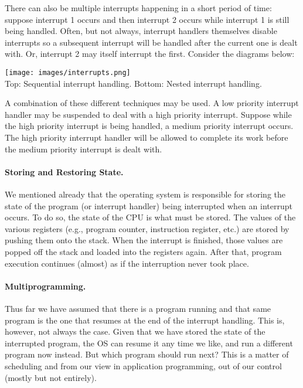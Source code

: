 There can also be multiple interrupts happening in a short period of time: suppose interrupt 1 occurs and then interrupt 2 occurs while interrupt 1 is still being handled. Often, but not always, interrupt handlers themselves disable interrupts so a subsequent interrupt will be handled after the current one is dealt with. Or, interrupt 2 may itself interrupt the first. Consider the diagrams below:

\begin{center}
	\texttt{[image: images/interrupts.png]}\\
	Top: Sequential interrupt handling. Bottom: Nested interrupt handling.~\cite{osi}
\end{center}

A combination of these different techniques may be used. A low priority interrupt handler may be suspended to deal with a high priority interrupt. Suppose while the high priority interrupt is being handled, a medium priority interrupt occurs. The high priority interrupt handler will be allowed to complete its work before the medium priority interrupt is dealt with.

\paragraph{Storing and Restoring State.} We mentioned already that the operating system is responsible for storing the state of the program (or interrupt handler) being interrupted when an interrupt occurs. To do so, the state of the CPU is what must be stored. The values of the various registers (e.g., program counter, instruction register, etc.) are stored by pushing them onto the stack. When the interrupt is finished, those values are popped off the stack and loaded into the registers again. After that, program execution continues (almost) as if the interruption never took place.

\paragraph{Multiprogramming.} Thus far we have assumed that there is a program running and that same program is the one that resumes at the end of the interrupt handling. This is, however, not always the case. Given that we have stored the state of the interrupted program, the OS can resume it any time we like, and run a different program now instead. But which program should run next? This is a matter of scheduling and from our view in application programming, out of our control (mostly but not entirely).


